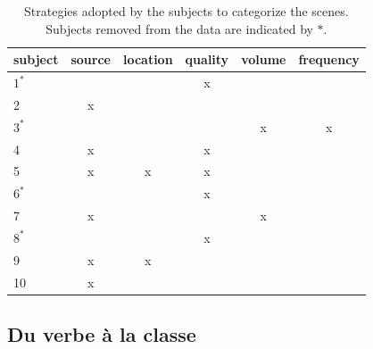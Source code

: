 \begin{table}[t]
\centering
\begin{tabular}{lccccc}
subject & source  & location & quality & volume & frequency  \\
\hline
    $1^*$&        &          &    x    &        &           \\
    2    &   x    &          &         &        &           \\
    $3^*$&        &          &         &    x   &     x     \\
    4    &   x    &          &    x    &        &           \\
    5    &   x    &    x     &    x    &        &           \\        
    $6^*$&        &          &    x    &        &           \\
    7    &   x    &          &         &    x   &           \\
    $8^*$&        &          &    x    &        &           \\
    9    &   x    &    x     &         &        &           \\
    10   &   x    &          &         &        &           \\
\hline
\end{tabular}
\vspace{0.5mm}
\caption{\label{tab:StratSate} Strategies adopted by the subjects to categorize the scenes. Subjects removed from the data are indicated by $*$.}
\end{table}

\subsection{Du verbe à la classe}

